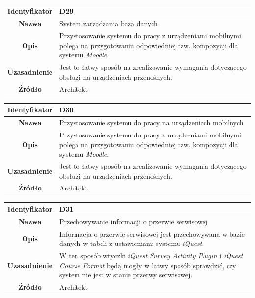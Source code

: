 \begin{table}[H]
\centering
\begin{tabular}{ | >{\bfseries}c | p{11cm} | }
\hline
%
Identyfikator & D29 \\ \hline
Nazwa & System zarządzania bazą danych \\ \hline
Opis & Przystosowanie systemu do pracy z urządzeniami mobilnymi polega na przygotowaniu odpowiedniej tzw. kompozycji dla systemu \textit{Moodle}. \\ \hline
Uzasadnienie & Jest to łatwy sposób na zrealizowanie wymagania dotyczącego obsługi na urządzeniach przenośnych. \\ \hline
Źródło & Architekt \\ \hline
%
\end{tabular}
\end{table}

\begin{table}[H]
\centering
\begin{tabular}{ | >{\bfseries}c | p{11cm} | }
\hline
%
Identyfikator & D30 \\ \hline
Nazwa & Przystosowanie systemu do pracy na urządzeniach mobilnych \\ \hline
Opis & Przystosowanie systemu do pracy z urządzeniami mobilnymi polega na przygotowaniu odpowiedniej tzw. kompozycji dla systemu \textit{Moodle}. \\ \hline
Uzasadnienie & Jest to łatwy sposób na zrealizowanie wymagania dotyczącego obsługi na urządzeniach przenośnych. \\ \hline
Źródło & Architekt \\ \hline
%
\end{tabular}
\end{table}

\begin{table}[H]
\centering
\begin{tabular}{ | >{\bfseries}c | p{11cm} | }
\hline
%
Identyfikator & D31 \\ \hline
Nazwa & Przechowywanie informacji o przerwie serwisowej \\ \hline
Opis & Informacja o przerwie serwisowej jest przechowywana w bazie danych w tabeli z ustawieniami systemu \textit{iQuest}. \\ \hline
Uzasadnienie & W ten sposób wtyczki \textit{iQuest Survey Activity Plugin} i \textit{iQuest Course Format} będą mogły w łatwy sposób sprawdzić, czy system nie jest w stanie przerwy serwisowej. \\ \hline
Źródło & Architekt \\ \hline
%
\end{tabular}
\end{table}

